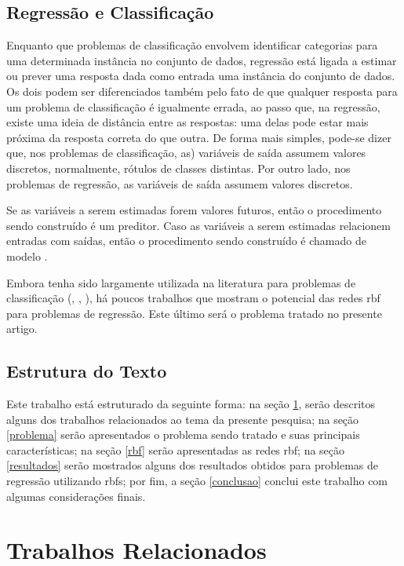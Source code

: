 \documentclass[conference]{IEEEtran}
\begin{document}
\subsection{Regressão e Classificação}
\label{regressaoxclassificacao}

Enquanto que problemas de classificação envolvem identificar categorias para 
uma determinada instância no conjunto de dados, regressão está ligada a estimar 
ou prever uma resposta dada como entrada uma instância do conjunto de dados. 
Os dois podem ser diferenciados também pelo fato de que qualquer resposta 
para um problema de classificação é igualmente errada, ao passo que, na 
regressão, existe uma ideia de distância entre as respostas: uma delas pode 
estar mais próxima da resposta correta do que outra. De forma mais simples, 
pode-se dizer que, nos problemas de classificação, as) variáveis de saída 
assumem valores discretos, normalmente, rótulos de classes distintas. Por outro 
lado, nos problemas de regressão, as variáveis de saída assumem valores 
discretos.

Se as variáveis a serem estimadas forem valores futuros, então o procedimento 
sendo construído é um preditor. Caso as variáveis a serem estimadas relacionem 
entradas com saídas, então o procedimento sendo construído é chamado de modelo
\cite{specht1991general}.

Embora tenha sido largamente utilizada na literatura para problemas de 
classificação (\cite{heartrbf}, \cite{wu2012using}, 
\cite{DBLP:conf/isnn/ZhaoYWWL06}), há poucos trabalhos que mostram o potencial 
das redes \ac*{rbf} para problemas de regressão. Este último será o problema 
tratado no presente artigo.

\subsection{Estrutura do Texto}
\label{estrutura}

Este trabalho está estruturado da seguinte forma: na seção \ref{relacionados}, 
serão descritos alguns dos trabalhos relacionados ao tema da presente pesquisa; 
na seção \ref{problema} serão apresentados o problema sendo tratado e suas 
principais características; na seção \ref{rbf} serão apresentadas as redes 
\ac*{rbf}; na seção \ref{resultados} serão mostrados alguns dos resultados 
obtidos para problemas de regressão utilizando \acp*{rbf}; por fim, a seção 
\ref{conclusao} conclui este trabalho com algumas considerações finais.

\section{Trabalhos Relacionados}
\label{relacionados}
\end{document}
